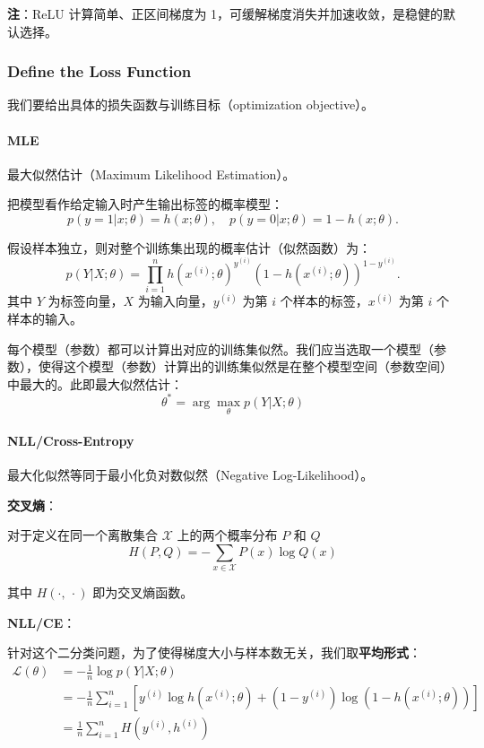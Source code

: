 \textbf{注}：ReLU 计算简单、正区间梯度为
1，可缓解梯度消失并加速收敛，是稳健的默认选择。

\subsubsection{Define the Loss Function}\label{define-the-loss-function}

我们要给出具体的损失函数与训练目标（optimization objective）。

\paragraph{MLE}\label{mle}

最大似然估计（Maximum Likelihood Estimation）。

把模型看作给定输入时产生输出标签的概率模型： \[
  p(y=1|x;\theta)=h(x; \theta),\quad p(y=0|x;\theta)=1-h(x; \theta).
\]

假设样本独立，则对整个训练集出现的概率估计（似然函数）为： \[
  p(Y|X;\theta)=\prod_{i=1}^n h(x^{(i)}; \theta)^{y^{(i)}} (1-h(x^{(i)}; \theta))^{1-y^{(i)}}.
\] 其中 \(Y\) 为标签向量，\(X\) 为输入向量，\(y^{(i)}\) 为第 \(i\)
个样本的标签，\(x^{(i)}\) 为第 \(i\) 个样本的输入。

每个模型（参数）都可以计算出对应的训练集似然。我们应当选取一个模型（参数），使得这个模型（参数）计算出的训练集似然是在整个模型空间（参数空间）中最大的。此即最大似然估计：
\[
  \theta^* = \arg\max_\theta p(Y|X;\theta)
\]

\paragraph{NLL/Cross-Entropy}\label{nllcross-entropy}

最大化似然等同于最小化负对数似然（Negative Log-Likelihood）。

\textbf{交叉熵}：

对于定义在同一个离散集合 $ \mathcal{X} $ 上的两个概率分布 $ P $ 和
$ Q $ \[
  H(P, Q) = -\sum_{x \in \mathcal{X}} P(x) \log Q(x)
\]

其中 \(H(\cdot,\ \cdot)\) 即为交叉熵函数。

\textbf{NLL/CE}：

针对这个二分类问题，为了使得梯度大小与样本数无关，我们取\textbf{平均形式}：
\[
  \begin{aligned}
    \mathcal{L}(\theta)
     & = -\frac{1}{n} \log p(Y|X;\theta)                                                                                 \\
     & = -\frac{1}{n} \sum_{i=1}^n \left[ y^{(i)}\log h(x^{(i)}; \theta) + (1-y^{(i)})\log(1-h(x^{(i)}; \theta)) \right] \\
     & = \frac{1}{n} \sum_{i=1}^n H(y^{(i)}, h^{(i)})
  \end{aligned}
\]

